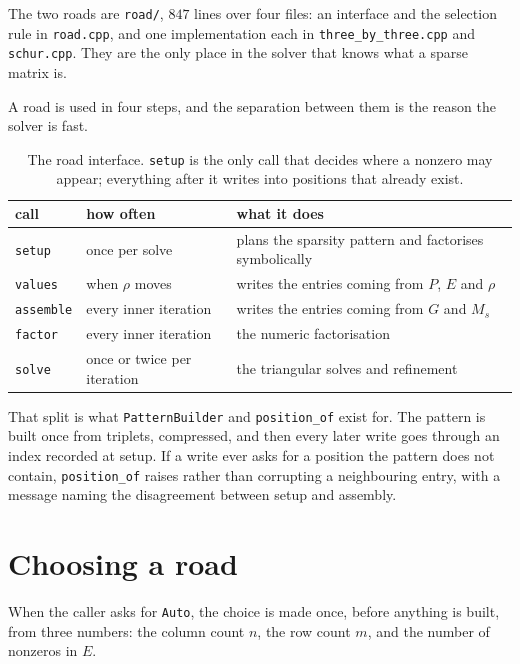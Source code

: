 \documentclass[a4paper,11pt]{book}
\theoremstyle{plain}
\theoremstyle{definition}
\theoremstyle{remark}
\numberwithin{equation}{chapter}
\numberwithin{algorithm}{chapter}
\begin{document}
	The two roads are \texttt{road/}, $847$ lines over four files: an interface
	and the selection rule in \texttt{road.cpp}, and one implementation each in
	\texttt{three\_by\_three.cpp} and \texttt{schur.cpp}. They are the only place
	in the solver that knows what a sparse matrix is.

	A road is used in four steps, and the separation between them is the reason
	the solver is fast.

	\begin{table}[H]
		\centering\small
		\begin{tabular}{lll}
			\toprule
			call & how often & what it does\\
			\midrule
			\texttt{setup} & once per solve & plans the sparsity pattern and
			factorises symbolically\\
			\texttt{values} & when $\rho$ moves & writes the entries coming from
			$P$, $E$ and $\rho$\\
			\texttt{assemble} & every inner iteration & writes the entries coming
			from $G$ and $M_s$\\
			\texttt{factor} & every inner iteration & the numeric factorisation\\
			\texttt{solve} & once or twice per iteration & the triangular solves
			and refinement\\
			\bottomrule
		\end{tabular}
		\caption{The road interface. \texttt{setup} is the only call that decides
			where a nonzero may appear; everything after it writes into positions
			that already exist.}
	\end{table}

	That split is what \texttt{PatternBuilder} and \texttt{position\_of} exist
	for. The pattern is built once from triplets, compressed, and then every
	later write goes through an index recorded at setup. If a write ever asks for
	a position the pattern does not contain, \texttt{position\_of} raises rather
	than corrupting a neighbouring entry, with a message naming the disagreement
	between setup and assembly.

	\section{Choosing a road}

	When the caller asks for \texttt{Auto}, the choice is made once, before
	anything is built, from three numbers: the column count $n$, the row count
	$m$, and the number of nonzeros in $E$.
\end{document}
